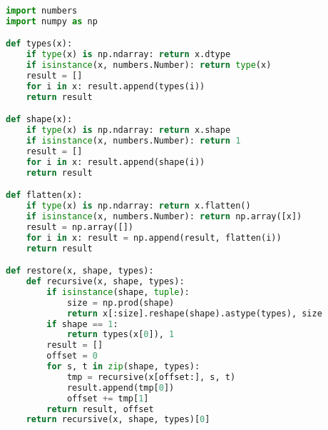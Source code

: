 \begin{lstlisting}[label=lst:deepflat, language=python, caption=deepflatten.py]
import numbers
import numpy as np

def types(x):
    if type(x) is np.ndarray: return x.dtype
    if isinstance(x, numbers.Number): return type(x)
    result = []
    for i in x: result.append(types(i))
    return result

def shape(x):
    if type(x) is np.ndarray: return x.shape
    if isinstance(x, numbers.Number): return 1
    result = []
    for i in x: result.append(shape(i))
    return result

def flatten(x):
    if type(x) is np.ndarray: return x.flatten()
    if isinstance(x, numbers.Number): return np.array([x])
    result = np.array([])
    for i in x: result = np.append(result, flatten(i))
    return result

def restore(x, shape, types):
    def recursive(x, shape, types):
        if isinstance(shape, tuple):
            size = np.prod(shape)
            return x[:size].reshape(shape).astype(types), size
        if shape == 1:
            return types(x[0]), 1
        result = []
        offset = 0
        for s, t in zip(shape, types):
            tmp = recursive(x[offset:], s, t)
            result.append(tmp[0])
            offset += tmp[1]
        return result, offset
    return recursive(x, shape, types)[0]
\end{lstlisting}

